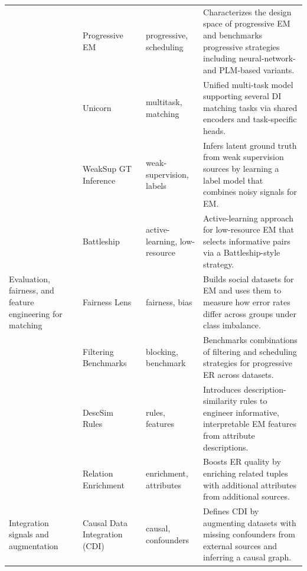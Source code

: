 \documentclass[sigconf]{acmart}
\begin{document}
\begin{table}[!htbp]
\begin{tabularx}{\textwidth}{@{}p{24mm}p{28mm}p{18mm}Y@{}}
~ &
Progressive EM~\cite{10.1145/3709715} &
progressive, scheduling &
Characterizes the design space of progressive EM and benchmarks progressive strategies including neural-network- and PLM-based variants. \\

~ &
Unicorn~\cite{10.1145/3588938} &
multitask, matching &
Unified multi-task model supporting several DI matching tasks via shared encoders and task-specific heads. \\

~ &
WeakSup GT Inference~\cite{10.1145/3588712} &
weak-supervision, labels &
Infers latent ground truth from weak supervision sources by learning a label model that combines noisy signals for EM. \\

~ &
Battleship~\cite{10.1145/3626711} &
active-learning, low-resource &
Active-learning approach for low-resource EM that selects informative pairs via a Battleship-style strategy. \\

\midrule

Evaluation, fairness, and feature engineering for matching &
Fairness Lens~\cite{10.14778/3611479.3611525} &
fairness, bias &
Builds social datasets for EM and uses them to measure how error rates differ across groups under class imbalance. \\

~ &
Filtering Benchmarks~\cite{10184692} &
blocking, benchmark &
Benchmarks combinations of filtering and scheduling strategies for progressive ER across datasets. \\

~ &
DescSim Rules~\cite{11112979} &
rules, features &
Introduces description-similarity rules to engineer informative, interpretable EM features from attribute descriptions. \\

~ &
Relation Enrichment~\cite{10.14778/3681954.3681987} &
enrichment, attributes &
Boosts ER quality by enriching related tuples with additional attributes from additional sources. \\

\midrule

Integration signals and augmentation &
Causal Data Integration (CDI)~\cite{10.14778/3603581.3603602} &
causal, confounders &
Defines CDI by augmenting datasets with missing confounders from external sources and inferring a causal graph. \\


\end{tabularx}
\end{table}
\end{document}
